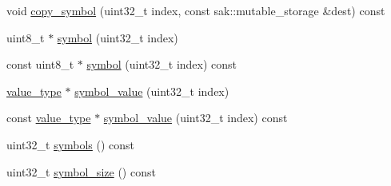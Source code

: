 \begin{DoxyCompactItemize}
void \hyperlink{classkodo_1_1proxy__layer_aea187e096f4e0ef81ce585c480a37346}{copy\-\_\-symbol} (uint32\-\_\-t index, const sak\-::mutable\-\_\-storage \&dest) const 
\begin{DoxyCompactList}\small\item\em \end{DoxyCompactList}\item 
uint8\-\_\-t $\ast$ \hyperlink{classkodo_1_1proxy__layer_a03645a649b76035b54165f00548b3782}{symbol} (uint32\-\_\-t index)
\begin{DoxyCompactList}\small\item\em \end{DoxyCompactList}\item 
const uint8\-\_\-t $\ast$ \hyperlink{classkodo_1_1proxy__layer_ae7b3311a4848af16078d408c0c4fd94d}{symbol} (uint32\-\_\-t index) const 
\begin{DoxyCompactList}\small\item\em \end{DoxyCompactList}\item 
\hyperlink{classkodo_1_1proxy__layer_a1e9ff5aada4a2ab5dc0ce4e7df39160a}{value\-\_\-type} $\ast$ \hyperlink{classkodo_1_1proxy__layer_a38eaacbf7c8a0c0c602bbf45859067ed}{symbol\-\_\-value} (uint32\-\_\-t index)
\begin{DoxyCompactList}\small\item\em \end{DoxyCompactList}\item 
const \hyperlink{classkodo_1_1proxy__layer_a1e9ff5aada4a2ab5dc0ce4e7df39160a}{value\-\_\-type} $\ast$ \hyperlink{classkodo_1_1proxy__layer_ae951cfb89bd7a6b07ec602c7f5e48d95}{symbol\-\_\-value} (uint32\-\_\-t index) const 
\begin{DoxyCompactList}\small\item\em \end{DoxyCompactList}\item 
uint32\-\_\-t \hyperlink{classkodo_1_1proxy__layer_a8b944d530e445fa4f507b4d8d8121aad}{symbols} () const 
\begin{DoxyCompactList}\small\item\em \end{DoxyCompactList}\item 
uint32\-\_\-t \hyperlink{classkodo_1_1proxy__layer_aae35623724e1a776d28e15fa95bfdc8e}{symbol\-\_\-size} () const 
\begin{DoxyCompactList}\small\item\em \end{DoxyCompactList}\item 

\end{DoxyCompactItemize}
